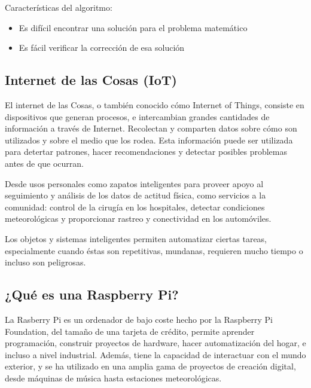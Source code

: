\noindent Características del algoritmo: 

\begin{itemize}
    \item Es difícil encontrar una solución para el problema matemático
    \item Es fácil verificar la corrección de esa solución
\end{itemize}

\subsection{Internet de las Cosas (IoT)}

El internet de las Cosas, o también conocido cómo Internet of Things, consiste en dispositivos que generan procesos, e 
intercambian grandes cantidades de información a través de Internet. Recolectan y comparten datos sobre cómo son 
utilizados y sobre el medio que los rodea. Esta información puede ser utilizada para detertar patrones, hacer 
recomendaciones y detectar posibles problemas antes de que ocurran.

\vspace{5mm}

\noindent Desde usos personales como zapatos inteligentes para proveer apoyo al seguimiento y análisis de los datos de 
actitud física, como servicios a la comunidad: control de la cirugía en los hospitales, detectar condiciones 
meteorológicas y proporcionar rastreo y conectividad en los automóviles.

\vspace{5mm}

\noindent  Los objetos y sistemas inteligentes permiten automatizar ciertas tareas, especialmente cuando éstas son 
repetitivas, mundanas, requieren mucho tiempo o incluso son peligrosas.

\subsection{¿Qué es una Raspberry Pi?}

La Rasberry Pi es un ordenador de bajo coste hecho por la Raspberry Pi Foundation, del tamaño de una tarjeta de crédito, 
permite aprender programación, construir proyectos de hardware, hacer automatización del hogar, e incluso a nivel 
industrial. Además, tiene la capacidad de interactuar con el mundo exterior, y se ha utilizado en una amplia gama de 
proyectos de creación digital, desde máquinas de música hasta estaciones meteorológicas.

